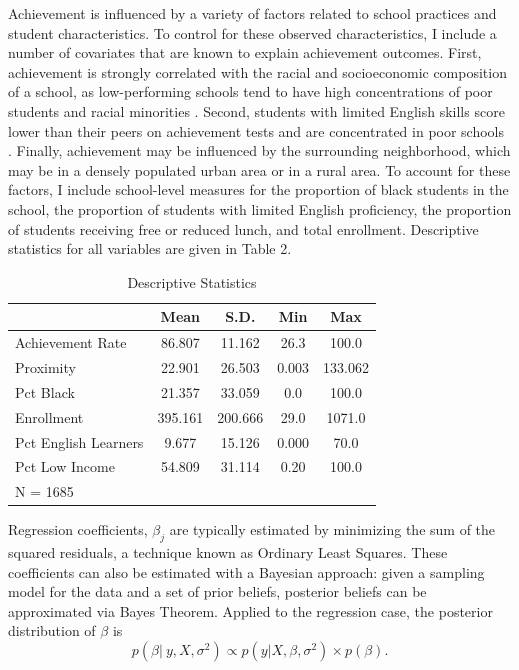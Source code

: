 \documentclass[11pt]{article}
\begin{document}
Achievement is influenced by a variety of factors related to school practices and student characteristics.  To control for these observed characteristics, I include a number of covariates that are known to explain achievement outcomes.  First, achievement is strongly correlated with the racial and socioeconomic composition of a school, as low-performing schools tend to have high concentrations of poor students and racial minorities \citep{orfield_why_2005,gamoran_equality_2006,jencks_black-white_1998}.  Second, students with limited English skills score lower than their peers on achievement tests and are concentrated in poor schools \citep{reardon_s.f._hispanic-white_2009,orfield_why_2005}.  Finally, achievement may be influenced by the surrounding neighborhood, which may be in a densely populated urban area or in a rural area.  To account for these factors, I include school-level measures for the proportion of black students in the school, the proportion of students with limited English proficiency, the proportion of students receiving free or reduced lunch, and total enrollment.  Descriptive statistics for all variables are given in Table 2.  

\begin{table}[h]
\centering
\caption{Descriptive Statistics} 
\begin{tabular}{|l|c|c|c|c|}
  \hline
 & Mean & S.D. & Min & Max \\ 
  \hline
Achievement Rate & 86.807 & 11.162 & 26.3 & 100.0 \\ 
   \hline
Proximity & 22.901 & 26.503 & 0.003 & 133.062 \\ 
   \hline
Pct Black & 21.357 & 33.059 & 0.0 & 100.0 \\ 
   \hline
Enrollment & 395.161 & 200.666 & 29.0 & 1071.0 \\ 
   \hline
Pct English Learners & 9.677 & 15.126 & 0.000 & 70.0 \\ 
   \hline
Pct Low Income & 54.809 & 31.114 & 0.20 & 100.0 \\ 
   \hline
N = 1685 &  &  &  &  \\ 
   \hline
\end{tabular}
\end{table}

Regression coefficients, $\beta_j$ are typically estimated by minimizing the sum of the squared residuals, a technique known as Ordinary Least Squares.  These coefficients can also be estimated with a Bayesian approach: given a sampling model for the data and a set of prior beliefs, posterior beliefs can be approximated via Bayes Theorem.  Applied to the regression case, the posterior distribution of $\beta$ is
\begin{equation*}
p(\beta\vert\ y,X,\sigma^2) \propto p(y\vert X,\beta,\sigma^2)\times p(\beta).   
\end{equation*}
\end{document}
